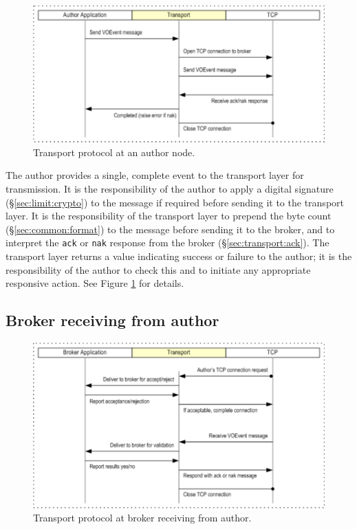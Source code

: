 \documentclass[a4paper,11pt]{ivoa}
\begin{document}
\begin{figure}[H]
  \begin{center}
  \includegraphics{figures/authortobroker.pdf}
  \end{center}

  \caption{Transport protocol at an author node.}

  \label{fig:protocol:authortobroker}
\end{figure}


The author provides a single, complete event to the transport layer for
transmission. It is the responsibility of the author to apply a digital
signature (\S\ref{sec:limit:crypto}) to the message if required before sending
it to the transport layer. It is the responsibility of the transport layer to
prepend the byte count (\S\ref{sec:common:format}) to the message before
sending it to the broker, and to interpret the \texttt{ack} or \texttt{nak}
response from the broker (\S\ref{sec:transport:ack}).  The transport layer
returns a value indicating success or failure to the author; it is the
responsibility of the author to check this and to initiate any appropriate
responsive action. See Figure \ref{fig:protocol:authortobroker} for details.

\subsection{Broker receiving from author}

\begin{figure}[H]
  \begin{center}
  \includegraphics{figures/brokerfromauthor.pdf}
  \end{center}

  \caption{Transport protocol at broker receiving from author.}

  \label{fig:protocol:brokerfromauthor}
\end{figure}
\end{document}

